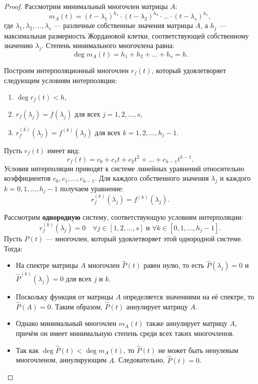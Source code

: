 \begin{proof}
\leavevmode \nl 

Рассмотрим минимальный многочлен матрицы \( A \):
\[
m_A(t) = (t - \lambda_1)^{h_1} \cdot (t - \lambda_2)^{h_2} \cdot \ldots \cdot (t - \lambda_s)^{h_s},
\]
где \( \lambda_1, \lambda_2, \ldots, \lambda_s \) — различные собственные значения матрицы \( A \), а \( h_j \) — максимальная размерность Жордановой клетки, соответствующей собственному значению \( \lambda_j \). Степень минимального многочлена равна:
\[
\deg m_A(t) = h_1 + h_2 + \ldots + h_s = h.
\]

Построим интерполяционный многочлен \( r_f(t) \), который удовлетворяет следующим условиям интерполяции:
\begin{enumerate}
    \item \( \deg r_f(t) < h \),
    \item \( r_f(\lambda_j) = f(\lambda_j) \) для всех \( j = 1, 2, \ldots, s \),
    \item \( r_f^{(k)}(\lambda_j) = f^{(k)}(\lambda_j) \) для всех \( k = 1, 2, \ldots, h_j - 1 \).
\end{enumerate}

Пусть \( r_f(t) \) имеет вид:
\[
r_f(t) = c_0 + c_1 t + c_2 t^2 + \ldots + c_{h-1} t^{h-1}.
\]
Условия интерполяции приводят к системе линейных уравнений относительно коэффициентов \( c_0, c_1, \ldots, c_{h-1} \). Для каждого собственного значения \( \lambda_j \) и каждого \( k = 0, 1, \ldots, h_j - 1 \) получаем уравнение:
\[
r_f^{(k)}(\lambda_j) = f^{(k)}(\lambda_j).
\]

Рассмотрим \textbf{однородную} систему, соответствующую условиям интерполяции:
\[
r_f^{(k)}(\lambda_j) = 0 \quad \forall j \in [1, 2, \ldots, s] \text{ и } \forall k \in [0, 1, \ldots, h_j - 1].
\]
Пусть \( \hat{P}(t) \) — многочлен, который удовлетворяет этой однородной системе. Тогда:
\begin{itemize}
    \item На спектре матрицы \( A \) многочлен \( \hat{P}(t) \) равен нулю, то есть \( \hat{P}(\lambda_j) = 0 \) и \( \hat{P}^{(k)}(\lambda_j) = 0 \) для всех \( j \) и \( k \).
    \item Поскольку функция от матрицы \( A \) определяется значениями на её спектре, то \( \hat{P}(A) = 0 \). Таким образом, \( \hat{P}(t) \) аннулирует матрицу \( A \).
    \item Однако минимальный многочлен \( m_A(t) \) также аннулирует матрицу \( A \), причём он имеет минимальную степень среди всех таких многочленов.
    \item Так как \( \deg \hat{P}(t) < \deg m_A(t) \), то \( \hat{P}(t) \) не может быть ненулевым многочленом, аннулирующим \( A \). Следовательно, \( \hat{P}(t) = 0 \).
\end{itemize}


\end{proof}
